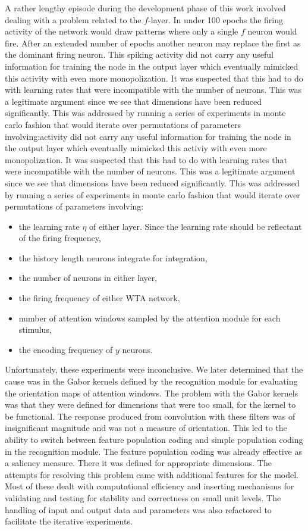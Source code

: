 \documentclass{report}
\begin{document}
A rather lengthy episode during the development phase of this work involved dealing with a problem related to the $f$-layer. In under 100 epochs the firing activity of the network would draw patterns where only a single $f$ neuron would fire. After an extended number of epochs another neuron may replace the first as the dominant firing neuron. This spiking activity did not carry any useful information for training the node in the output layer which eventually mimicked this activity with even more monopolization. It was suspected that this had to do with learning rates that were incompatible with the number of neurons. This was a legitimate argument since we see that dimensions have been reduced significantly. This was addressed by running a series of experiments in monte carlo fashion that would iterate over permutations of parameters involving:activity did not carry any useful information for training the node in the output layer which eventually mimicked this activiy with even more monopolization. It was suspected that this had to do with learning rates that were incompatible with the number of neurons. This was a legitimate argument since we see that dimensions have been reduced significantly. This was addressed by running a series of experiments in monte carlo fashion that would iterate over permutations of parameters involving:
\begin{itemize}
  \item the learning rate $\eta$ of either layer. Since the learning rate should be reflectant of the firing frequency,
  \item the history length neurons integrate for integration,
  \item the number of neurons in either layer,
  \item the firing frequency of either WTA network,
  \item number of attention windows sampled by the attention module for each stimulus,
  \item the encoding frequency of $y$ neurons.
\end{itemize}
Unfortunately, these experiments were inconclusive. We later determined that the cause was in the Gabor kernels defined by the recognition module for evaluating the orientation maps of attention windows. The problem with the Gabor kernels was that they were defined for dimensions that were too small, for the kernel to be functional. The response produced from convolution with these filters was of insignificant magnitude and was not a measure of orientation. This led to the ability to switch between feature population coding and simple population coding in the recognition module. The feature population coding was already effective as a saliency measure. There it was defined for appropriate dimensions. The attempts for resolving this problem came with additional features for the model. Most of these dealt with computational efficiency and inserting mechanisms for validating and testing for stability and correctness on small unit levels. The handling of input and output data and parameters was also refactored to facilitate the iterative experiments.
\end{document}
